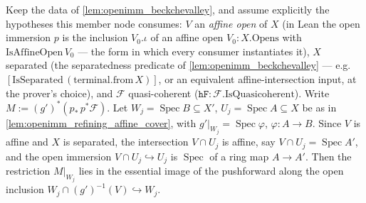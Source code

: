 \begin{lemma}
  \label{lem:openimm_bareBC_app_isIso_affine}
  Keep the data of \cref{lem:openimm_beckchevalley}, and assume explicitly the hypotheses this
  member node consumes: \(V\) an \emph{affine open} of \(X\) (in Lean the open immersion \(p\) is
  the inclusion \(V_0.\iota\) of an affine open \(V_0 : X.\mathrm{Opens}\) with
  \(\mathrm{IsAffineOpen}\,V_0\) --- the form in which every consumer instantiates it), \(X\)
  separated (the separatedness predicate of \cref{lem:openimm_beckchevalley} --- e.g.\
  \([\mathrm{IsSeparated}\,(\mathrm{terminal.from}\,X)]\), or an equivalent affine-intersection
  input, at the prover's choice), and \(\mathcal{F}\) quasi-coherent
  (\(\mathtt{hF} : \mathcal{F}.\mathrm{IsQuasicoherent}\)).
  Write \(M := (g')^*(p_*\,p^*\mathcal{F})\).  Let \(W_j = \operatorname{Spec} B \subseteq X'\),
  \(U_j = \operatorname{Spec} A \subseteq X\) be as in \cref{lem:openimm_refining_affine_cover},
  with \(g'|_{W_j} = \operatorname{Spec}\varphi\), \(\varphi : A \to B\). Since \(V\) is affine and
  \(X\) is separated, the intersection \(V \cap U_j\) is affine, say \(V \cap U_j =
  \operatorname{Spec} A'\), and the open immersion \(V \cap U_j \hookrightarrow U_j\) is
  \(\operatorname{Spec}\) of a ring map \(A \to A'\). Then the restriction \(M|_{W_j}\) lies in
  the essential image of the pushforward along the open inclusion
  \(W_j \cap (g')^{-1}(V) \hookrightarrow W_j\).
\end{lemma}
